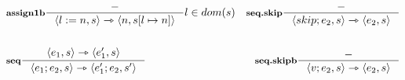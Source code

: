 \documentclass[a4paper, 10pt]{article}
\newcommand{\infer}[4]{\inference[\textbf{#1}]{#2}{#3}#4 }
\newcommand{\srule}[2]{\langle #1 \rangle \rightarrowtriangle \langle #2 \rangle}
\newcommand{\memrep}[3]{#1 \lbrack #2 \mapsto #3 \rbrack}
\begin{document}
	\begin{align*}
		&\infer{assign1b}{-}{\srule{l:=n,s}{n, \memrep{s}{l}{n}}}{l \in dom(s)}
		&\infer{seq.skip}{-}{\srule{skip;e_2,s}{e_2,s}}{} \\ \\
		&\infer{seq}{\srule{e_1,s}{e_1',s}}{\srule{e_1;e_2,s}{e_1';e_2,s'}}{}
		&\infer{seq.skipb}{-}{\srule{v;e_2,s}{e_2,s}}{}
	\end{align*}
\end{document}
